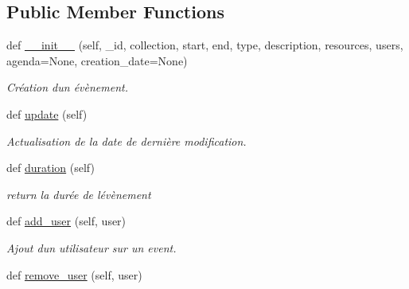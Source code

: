 \subsection*{Public Member Functions}
\begin{DoxyCompactItemize}
\item 
def \mbox{\hyperlink{classSource_1_1core_1_1event_1_1Event_aa661baba9387dbb7b60fc6d90028dc2a}{\+\_\+\+\_\+init\+\_\+\+\_\+}} (self, \+\_\+id, collection, start, end, type, description, resources, users, agenda=None, creation\+\_\+date=None)
\begin{DoxyCompactList}\small\item\em Création d\textquotesingle{}un évènement. \end{DoxyCompactList}\item 
def \mbox{\hyperlink{classSource_1_1core_1_1event_1_1Event_ac97a1c0a1f4e7b5a96d4584c6c623f75}{update}} (self)
\begin{DoxyCompactList}\small\item\em Actualisation de la date de dernière modification. \end{DoxyCompactList}\item 
\mbox{\label{classSource_1_1core_1_1event_1_1Event_a60d7defd3e3d2af8764016d376d94433}} 
def \mbox{\hyperlink{classSource_1_1core_1_1event_1_1Event_a60d7defd3e3d2af8764016d376d94433}{duration}} (self)
\begin{DoxyCompactList}\small\item\em return la durée de l\textquotesingle{}évènement \end{DoxyCompactList}\item 
\mbox{\label{classSource_1_1core_1_1event_1_1Event_a3fd82af192d7dacd5daffcb4945fa40d}} 
def \mbox{\hyperlink{classSource_1_1core_1_1event_1_1Event_a3fd82af192d7dacd5daffcb4945fa40d}{add\+\_\+user}} (self, user)
\begin{DoxyCompactList}\small\item\em Ajout d\textquotesingle{}un utilisateur sur un event. \end{DoxyCompactList}\item 
\mbox{\label{classSource_1_1core_1_1event_1_1Event_af65b6800b73ce8b9c101d26aa0692360}} 
def \mbox{\hyperlink{classSource_1_1core_1_1event_1_1Event_af65b6800b73ce8b9c101d26aa0692360}{remove\+\_\+user}} (self, user)

\end{DoxyCompactItemize}
